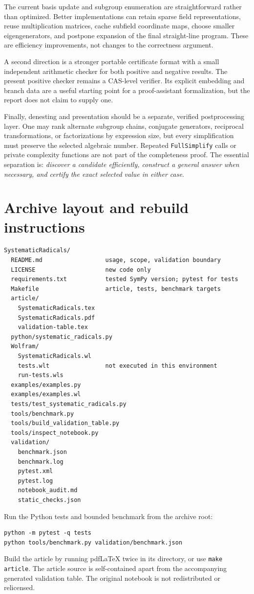 \documentclass[11pt,letterpaper]{article}
\theoremstyle{definition}\newtheorem{definition}[theorem]{Definition}
\theoremstyle{remark}\newtheorem{remark}[theorem]{Remark}
\newcommand{\code}[1]{\texttt{#1}}
\begin{document}
The current basis update and subgroup enumeration are straightforward
rather than optimized. Better implementations can retain sparse field
representations, reuse multiplication matrices, cache subfield coordinate
maps, choose smaller eigengenerators, and postpone expansion of the final
straight-line program. These are efficiency improvements, not changes to
the correctness argument.

A second direction is a stronger portable certificate format with a small
independent arithmetic checker for both positive and negative results.
The present positive checker remains a CAS-level verifier. Its explicit
embedding and branch data are a useful starting point for a proof-assistant
formalization, but the report does not claim to supply one.

Finally, denesting and presentation should be a separate, verified
postprocessing layer. One may rank alternate subgroup chains, conjugate
generators, reciprocal transformations, or factorizations by expression
size, but every simplification must preserve the selected algebraic
number. Repeated \code{FullSimplify} calls or private complexity functions
are not part of the completeness proof. The essential separation is:
\emph{discover a candidate efficiently, construct a general answer when
necessary, and certify the exact selected value in either case}.

\clearpage
\appendix
\section{Archive layout and rebuild instructions}
\begin{lstlisting}
SystematicRadicals/
  README.md                  usage, scope, validation boundary
  LICENSE                    new code only
  requirements.txt           tested SymPy version; pytest for tests
  Makefile                   article, tests, benchmark targets
  article/
    SystematicRadicals.tex
    SystematicRadicals.pdf
    validation-table.tex
  python/systematic_radicals.py
  Wolfram/
    SystematicRadicals.wl
    tests.wlt                not executed in this environment
    run-tests.wls
  examples/examples.py
  examples/examples.wl
  tests/test_systematic_radicals.py
  tools/benchmark.py
  tools/build_validation_table.py
  tools/inspect_notebook.py
  validation/
    benchmark.json
    benchmark.log
    pytest.xml
    pytest.log
    notebook_audit.md
    static_checks.json
\end{lstlisting}
Run the Python tests and bounded benchmark from the archive root:
\begin{lstlisting}
python -m pytest -q tests
python tools/benchmark.py validation/benchmark.json
\end{lstlisting}
Build the article by running pdfLaTeX twice in its directory,
or use \code{make article}. The article source is self-contained apart from
the accompanying generated validation table. The original notebook is not
redistributed or relicensed.
\end{document}
